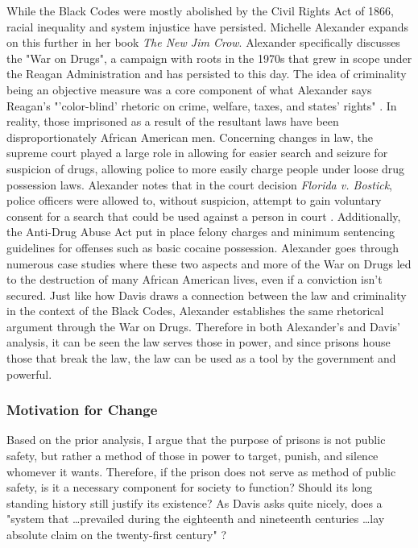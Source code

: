 While the Black Codes were mostly abolished by the Civil Rights Act of 1866, racial inequality and system injustice have persisted. Michelle Alexander expands on this further in her book \textit{The New Jim Crow}. Alexander specifically discusses the "War on Drugs", a campaign with roots in the 1970s that grew in scope under the Reagan Administration and has persisted to this day. The idea of criminality being an objective measure was a core component of what Alexander says Reagan's "'color-blind' rhetoric on crime, welfare, taxes, and states' rights" \cite[47]{alexanderNewJimCrow2012}. In reality, those imprisoned as a result of the resultant laws have been disproportionately African American men. Concerning changes in law, the supreme court played a large role in allowing for easier search and seizure for suspicion of drugs, allowing police to more easily charge people under loose drug possession laws. Alexander notes that in the court decision \textit{Florida v. Bostick}, police officers were allowed to, without suspicion, attempt to gain voluntary consent for a search that could be used against a person in court \cite[63]{alexanderNewJimCrow2012}. Additionally, the Anti-Drug Abuse Act put in place felony charges and minimum sentencing guidelines for offenses such as basic cocaine possession. Alexander goes through numerous case studies where these two aspects and more of the War on Drugs led to the destruction of many African American lives, even if a conviction isn't secured. Just like how Davis draws a connection between the law and criminality in the context of the Black Codes, Alexander establishes the same rhetorical argument through the War on Drugs. Therefore in both Alexander's and Davis' analysis, it can be seen the law serves those in power, and since prisons house those that break the law, the law can be used as a tool by the government and powerful.

\subsubsection*{Motivation for Change}
Based on the prior analysis, I argue that the purpose of prisons is not public safety, but rather a method of those in power to target, punish, and silence whomever it wants. Therefore, if the prison does not serve as method of public safety, is it a necessary component for society to function? Should its long standing history still justify its existence? As Davis asks quite nicely, does a "system that \ldots prevailed during the eighteenth and nineteenth centuries \ldots lay absolute claim on the twenty-first century" \cite[43]{davisArePrisonsObsolete2003}?

